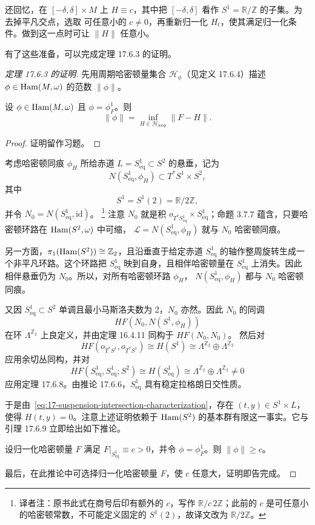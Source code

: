 还回忆，在 $[-\delta,\delta]\times M$ 上 $H\equiv c$，其中把
$[-\delta,\delta]$ 看作 $S^1=\mathbb R/\mathbb Z$ 的子集。为去掉平凡交点，选取
可任意小的 $c\neq0$，再重新归一化 $H_t$，使其满足归一化条件。做到这一点时可让
$\|H\|$ 任意小。

有了这些准备，可以完成定理 17.6.3 的证明。

\begin{proof}[定理 17.6.3 的证明]
先用周期哈密顿量集合 $\mathcal H_\phi$（见定义 17.6.4）描述
$\phi\in\operatorname{Ham}(M,\omega)$ 的\personHofer{}范数 $\|\phi\|$。

\begin{lemma}
\label{lem:hofer-norm-loop-infimum}
设 $\phi\in\operatorname{Ham}(M,\omega)$ 且 $\phi=\phi_F^1$。则
\[
 \|\phi\|=\inf_{H\in\mathcal H_{\mathrm{loop}}}\|F-H\|.
\]
\end{lemma}

\begin{proof}
证明留作习题。
\end{proof}

考虑哈密顿同痕 $\phi_H$ 所给赤道
$L=S_{\mathrm{eq}}^1\subset S^2$ 的悬垂，记为
\[
 N(S_{\mathrm{eq}}^1,\phi_H)\subset T^*S^1\times S^2,
\]
其中
\[
 S^1=S^1(2)=\mathbb R/2\mathbb Z,
\]
并令 $N_0=N(S_{\mathrm{eq}}^1,\mathrm{id})$。
\footnote{译者注：原书此式在商号后印有额外的 $c$，写作
$\mathbb R/c\,2\mathbb Z$；此前的 $c$ 是可任意小的哈密顿常数，不可能定义固定的
$S^1(2)$，故译文改为 $\mathbb R/2\mathbb Z$。}
注意 $N_0$ 就是积 $o_{T^*S_{\mathrm{eq}}^1}\times S_{\mathrm{eq}}^1$；命题 3.7.7
蕴含，只要哈密顿环路在 $\operatorname{Ham}(S^2,\omega)$ 中可缩，
$\mathcal L=N(S_{\mathrm{eq}}^1,\phi_H)$ 就与 $N_0$ 哈密顿同痕。

另一方面，$\pi_1(\operatorname{Ham}(S^2))\cong\mathbb Z_2$，且沿垂直于给定赤道
$S_{\mathrm{eq}}^1$ 的轴作整周旋转生成一个非平凡环路。这个环路把
$S_{\mathrm{eq}}^1$ 映到自身，且相伴哈密顿量在 $S_{\mathrm{eq}}^1$ 上消失。因此
相伴悬垂仍为 $N_0$。所以，对所有哈密顿环路 $\phi_H$，
$N(S_{\mathrm{eq}}^1,\phi_H)$ 都与 $N_0$ 哈密顿同痕。

又因 $S_{\mathrm{eq}}^1\subset S^2$ 单调且最小马斯洛夫数为 2，$N_0$ 亦然。因此
$N_0$ 的\personFloer{}同调
\[
 HF(N_0,N(S^1,\phi_H))
\]
在\personNovikov{}环 $\Lambda^{\mathbb Z_2}$ 上良定义，并由定理 16.4.11 同构于
$HF(N_0,N_0)$。
然后对
\[
 HF(o_{T^*S^1},o_{T^*S^1})\cong H(S^1)
 \cong\Lambda^{\mathbb Z_2}\oplus\Lambda^{\mathbb Z_2}
\]
应用余切丛同构，并对
\[
 HF(S_{\mathrm{eq}}^1,S_{\mathrm{eq}}^1;S^2)
 \cong H(S_{\mathrm{eq}}^1)
 \cong\Lambda^{\mathbb Z_2}\oplus\Lambda^{\mathbb Z_2}\neq0
\]
应用定理 17.6.8。由推论 17.6.6，$S_{\mathrm{eq}}^1$ 具有稳定拉格朗日交性质。

于是由~\eqref{eq:17-suspension-intersection-characterization}，存在
$(t,y)\in S^1\times L$，使得 $H(t,y)=0$。注意上述证明依赖于
$\operatorname{Ham}(S^2)$ 的基本群有限这一事实。它与引理 17.6.9 立即给出如下推论。

\begin{corollary}
\label{cor:hofer-lower-bound-equator}
设归一化哈密顿量 $F$ 满足
$F|_{S_{\mathrm{eq}}^1}\equiv c>0$，并令 $\phi=\phi_F^1$。则
$\|\phi\|\geq c$。
\end{corollary}

最后，在此推论中可选择归一化哈密顿量 $F$，使 $c$ 任意大，证明即告完成。
\end{proof}

